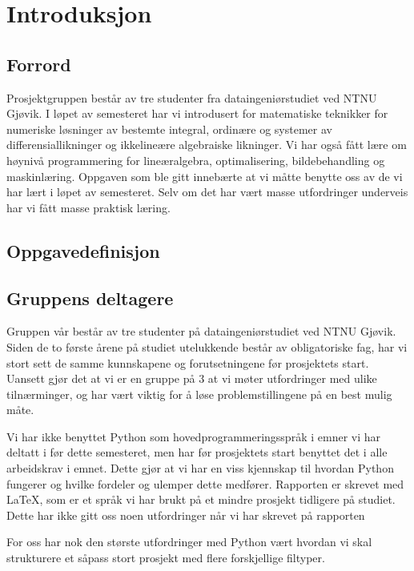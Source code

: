 \section{Introduksjon}

\subsection{Forrord}
Prosjektgruppen består av tre studenter fra dataingeniørstudiet ved NTNU Gjøvik. I løpet av 
semesteret har vi introdusert for matematiske teknikker for numeriske løsninger av bestemte 
integral, ordinære og systemer av differensiallikninger og ikkelineære algebraiske likninger. 
Vi har også fått lære om høynivå programmering for lineæralgebra, optimalisering, bildebehandling 
og maskinlæring. Oppgaven som ble gitt innebærte at vi måtte benytte oss av de vi har lært i løpet
av semesteret. Selv om det har vært masse utfordringer underveis har vi fått masse praktisk 
læring. 

\subsection{Oppgavedefinisjon}

\subsection{Gruppens deltagere}
Gruppen vår består av tre studenter på dataingeniørstudiet ved NTNU Gjøvik. Siden de to første årene på
studiet utelukkende består av obligatoriske fag, har vi stort sett de samme kunnskapene og 
forutsetningene før prosjektets start. Uansett gjør det at vi er en gruppe på 3 at vi møter utfordringer
med ulike tilnærminger, og har vært viktig for å løse problemstillingene på en best mulig måte.

Vi har ikke benyttet Python som hovedprogrammeringsspråk i emner vi har deltatt i før dette semesteret,
men har før prosjektets start benyttet det i alle arbeidskrav i emnet. Dette gjør at vi har en viss 
kjennskap til hvordan Python fungerer og hvilke fordeler og ulemper dette medfører. Rapporten er skrevet 
med LaTeX, som er et språk vi har brukt på et mindre prosjekt tidligere på studiet. Dette har ikke
gitt oss noen utfordringer når vi har skrevet på rapporten

For oss har nok den største utfordringer med Python vært hvordan vi skal strukturere et såpass stort
prosjekt med flere forskjellige filtyper. 